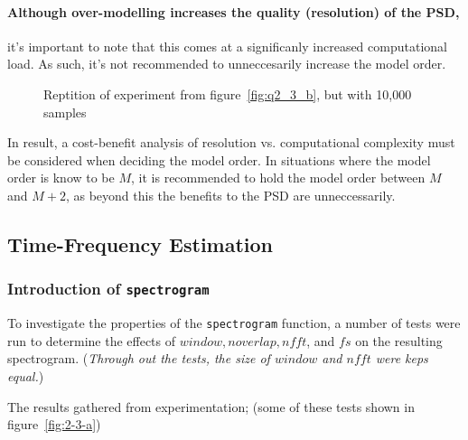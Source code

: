 \documentclass[main.tex]{subfiles}
\begin{document}
\paragraph{Although over-modelling increases the quality (resolution) of the PSD,} it's important to note that this comes at a significanly increased computational load. As such, it's not recommended to unneccesarily increase the model order.

\begin{figure}[H]
	\centering 
	\resizebox{\textwidth}{!}{}
	\caption{Reptition of experiment from figure~\ref{fig:q2_3_b}, but with 10,000 samples}
	\label{fig:q2_3_c}
\end{figure}


In result, a cost-benefit analysis of resolution vs. computational complexity must be considered when deciding the model order. In situations where the model order is know to be $M$, it is recommended to hold the model order between $M$ and $M+2$, as beyond this the benefits to the PSD are unneccessarily.






\subsection{Time-Frequency Estimation}

\subsubsection{Introduction of {\tt spectrogram}}

To investigate the properties of the {\tt spectrogram} function, a number of tests were run to determine the effects of $window, noverlap, nfft$, and $fs$ on the resulting spectrogram. (\textit{Through out the tests, the size of $window$ and $nfft$ were keps equal.})

The results gathered from experimentation; (some of these tests shown in figure~\ref{fig:2-3-a})
\end{document}
